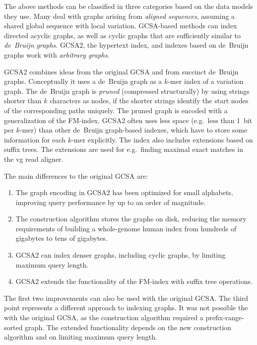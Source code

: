 \documentclass[twoside,leqno,twocolumn]{article}
\newcommand{\kmer}[1]{$#1$\nobreakdash-mer}
\begin{document}
The above methods can be classified in three categories based on the data models they use. Many deal with graphs arising from \emph{aligned sequences}, assuming a shared global sequence with local variation. GCSA-based methods can index directed acyclic graphs, as well as cyclic graphs that are sufficiently similar to \emph{de~Bruijn graphs}. GCSA2, the hypertext index, and indexes based on de~Bruijn graphs work with \emph{arbitrary graphs}.

GCSA2 combines ideas from the original GCSA and from succinct de~Bruijn graphs. Conceptually it uses a de~Bruijn graph as a \kmer{k} index of a variation graph. The de~Bruijn graph is \emph{pruned} (compressed structurally) by using strings shorter than $k$ characters as nodes, if the shorter strings identify the start nodes of the corresponding paths uniquely. The pruned graph is encoded with a generalization of the FM\nobreakdash-index. GCSA2 often uses less space (e.g.~less than 1~bit per \kmer{k}) than other de~Bruijn graph-based indexes, which have to store some information for each \kmer{k} explicitly. The index also includes extensions based on suffix trees. The extensions are used for e.g.~finding maximal exact matches in the vg read aligner.

The main differences to the original GCSA are:
\begin{enumerate}

\item The graph encoding in GCSA2 has been optimized for small alphabets, improving query performance by up to an order of magnitude.

\item The construction algorithm stores the graphs on disk, reducing the memory requirements of building a whole-genome human index from hundreds of gigabytes to tens of gigabytes.

\item GCSA2 can index denser graphs, including cyclic graphs, by limiting maximum query length.

\item GCSA2 extends the functionality of the FM-index with suffix tree operations.

\end{enumerate}
The first two improvements can also be used with the original GCSA. The third point represents a different approach to indexing graphs. It was not possible the with the original GCSA, as the construction algorithm required a prefix-range-sorted graph. The extended functionality depends on the new construction algorithm and on limiting maximum query length.
\end{document}
